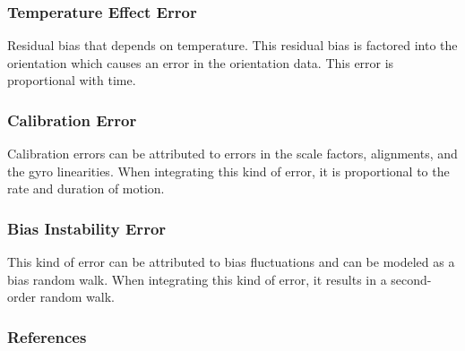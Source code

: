 \documentclass[10pt]{beamer}
\begin{document}
\begin{frame}
\frametitle{Temperature Effect Error}
Residual bias that depends on temperature. This residual bias is factored into the orientation which causes an error in the orientation data. This error is proportional with time.
\end{frame}

\begin{frame}
\frametitle{Calibration Error}
Calibration errors can be attributed to errors in the scale factors, alignments, and the gyro linearities. When integrating this kind of error, it is proportional to the rate and duration of motion.
\end{frame}

\begin{frame}
\frametitle{Bias Instability Error}
This kind of error can be attributed to bias fluctuations and can be modeled as a bias random walk. When integrating this kind of error, it results in a second-order random walk.  
\end{frame}

\begin{frame}
\frametitle{References}


\end{frame}
\end{document}
